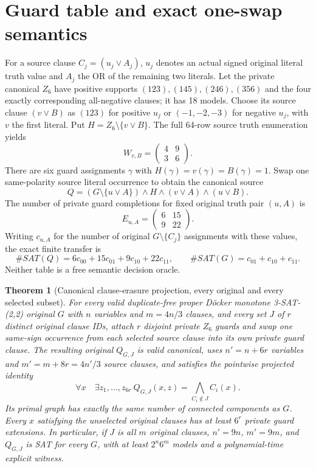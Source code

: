 \documentclass[11pt]{article}
\newtheorem{theorem}{Theorem}
\begin{document}
\section{Guard table and exact one-swap semantics}
For a source clause $C_j=(u_j\lor A_j)$, $u_j$ denotes an actual signed original literal truth value and $A_j$ the OR of the remaining two literals. Let the private canonical $Z_6$ have positive supports $(123),(145),(246),(356)$ and the four exactly corresponding all-negative clauses; it has 18 models. Choose its source clause $(v\lor B)$ as $(123)$ for positive $u_j$ or $(-1,-2,-3)$ for negative $u_j$, with $v$ the first literal. Put $H=Z_6\setminus\{v\lor B\}$. The full 64-row source truth enumeration yields
\[
W_{v,B}=\begin{pmatrix}4&9\\3&6\end{pmatrix}.
\]
There are six guard assignments $\gamma$ with $H(\gamma)=v(\gamma)=B(\gamma)=1$. Swap one same-polarity source literal occurrence to obtain the canonical source
\[
Q=(G\setminus\{u\lor A\})\land H\land(v\lor A)\land(u\lor B).
\]
The number of private guard completions for fixed original truth pair $(u,A)$ is
\[
E_{u,A}=\begin{pmatrix}6&15\\9&22\end{pmatrix}.
\]
Writing $c_{u,A}$ for the number of original $G\setminus\{C_j\}$ assignments with these values, the exact finite transfer is
\[
\#SAT(Q)=6c_{00}+15c_{01}+9c_{10}+22c_{11},
\qquad \#SAT(G)=c_{01}+c_{10}+c_{11}.
\]
Neither table is a free semantic decision oracle.
\begin{theorem}[Canonical clause-erasure projection, every original and every selected subset]
For every valid duplicate-free proper D\"ocker monotone 3-SAT-(2,2) original $G$ with $n$ variables and $m=4n/3$ clauses, and every set $J$ of $r$ distinct original clause IDs, attach $r$ disjoint private $Z_6$ guards and swap one same-sign occurrence from each selected source clause into its own private guard clause. The resulting original $Q_{G,J}$ is valid canonical, uses $n'=n+6r$ variables and $m'=m+8r=4n'/3$ source clauses, and satisfies the pointwise projected identity
\[
\boxed{\quad\forall x\quad \exists z_1,\ldots,z_{6r}\ Q_{G,J}(x,z)
     =\bigwedge_{C_i\notin J}C_i(x).\quad}
\]
Its primal graph has exactly the same number of connected components as $G$. Every $x$ satisfying the unselected original clauses has at least $6^r$ private guard extensions. In particular, if $J$ is all $m$ original clauses, $n'=9n$, $m'=9m$, and $Q_{G,J}$ is SAT for \emph{every} $G$, with at least $2^n6^m$ models and a polynomial-time explicit witness.
\end{theorem}
\end{document}

